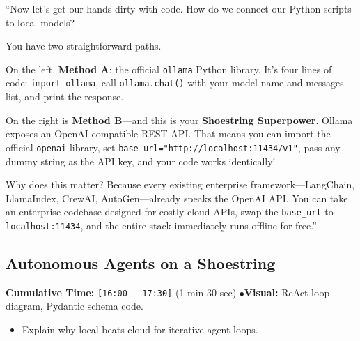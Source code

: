 \documentclass[11pt,a4paper]{article}
\begin{document}
\begin{speechbox}
``Now let's get our hands dirty with code. How do we connect our Python scripts to local models?

You have two straightforward paths.

On the left, \textbf{Method A}: the official \texttt{ollama} Python library. It's four lines of code: \texttt{import ollama}, call \texttt{ollama.chat()} with your model name and messages list, and print the response.

On the right is \textbf{Method B}---and this is your \textbf{Shoestring Superpower}. Ollama exposes an OpenAI-compatible REST API. That means you can import the official \texttt{openai} library, set \texttt{base\_url="http://localhost:11434/v1"}, pass any dummy string as the API key, and your code works identically!

Why does this matter? Because every existing enterprise framework---LangChain, LlamaIndex, CrewAI, AutoGen---already speaks the OpenAI API. You can take an enterprise codebase designed for costly cloud APIs, swap the \texttt{base\_url} to \texttt{localhost:11434}, and the entire stack immediately runs offline for free.''
\end{speechbox}

\subsection{Autonomous Agents on a Shoestring}
\begin{directionbox}
    \textbf{Cumulative Time:} \texttt{[16:00 - 17:30]} (1 min 30 sec) \quad$\bullet$\quad \textbf{Visual:} ReAct loop diagram, Pydantic schema code.
    \begin{itemize}
        \item Explain why local beats cloud for iterative agent loops.
    \end{itemize}
\end{directionbox}
\end{document}
